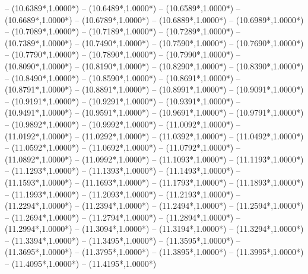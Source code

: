{	-- ({10.6389*\dx},{1.0000*\dy})
	-- ({10.6489*\dx},{1.0000*\dy})
	-- ({10.6589*\dx},{1.0000*\dy})
	-- ({10.6689*\dx},{1.0000*\dy})
	-- ({10.6789*\dx},{1.0000*\dy})
	-- ({10.6889*\dx},{1.0000*\dy})
	-- ({10.6989*\dx},{1.0000*\dy})
	-- ({10.7089*\dx},{1.0000*\dy})
	-- ({10.7189*\dx},{1.0000*\dy})
	-- ({10.7289*\dx},{1.0000*\dy})
	-- ({10.7389*\dx},{1.0000*\dy})
	-- ({10.7490*\dx},{1.0000*\dy})
	-- ({10.7590*\dx},{1.0000*\dy})
	-- ({10.7690*\dx},{1.0000*\dy})
	-- ({10.7790*\dx},{1.0000*\dy})
	-- ({10.7890*\dx},{1.0000*\dy})
	-- ({10.7990*\dx},{1.0000*\dy})
	-- ({10.8090*\dx},{1.0000*\dy})
	-- ({10.8190*\dx},{1.0000*\dy})
	-- ({10.8290*\dx},{1.0000*\dy})
	-- ({10.8390*\dx},{1.0000*\dy})
	-- ({10.8490*\dx},{1.0000*\dy})
	-- ({10.8590*\dx},{1.0000*\dy})
	-- ({10.8691*\dx},{1.0000*\dy})
	-- ({10.8791*\dx},{1.0000*\dy})
	-- ({10.8891*\dx},{1.0000*\dy})
	-- ({10.8991*\dx},{1.0000*\dy})
	-- ({10.9091*\dx},{1.0000*\dy})
	-- ({10.9191*\dx},{1.0000*\dy})
	-- ({10.9291*\dx},{1.0000*\dy})
	-- ({10.9391*\dx},{1.0000*\dy})
	-- ({10.9491*\dx},{1.0000*\dy})
	-- ({10.9591*\dx},{1.0000*\dy})
	-- ({10.9691*\dx},{1.0000*\dy})
	-- ({10.9791*\dx},{1.0000*\dy})
	-- ({10.9892*\dx},{1.0000*\dy})
	-- ({10.9992*\dx},{1.0000*\dy})
	-- ({11.0092*\dx},{1.0000*\dy})
	-- ({11.0192*\dx},{1.0000*\dy})
	-- ({11.0292*\dx},{1.0000*\dy})
	-- ({11.0392*\dx},{1.0000*\dy})
	-- ({11.0492*\dx},{1.0000*\dy})
	-- ({11.0592*\dx},{1.0000*\dy})
	-- ({11.0692*\dx},{1.0000*\dy})
	-- ({11.0792*\dx},{1.0000*\dy})
	-- ({11.0892*\dx},{1.0000*\dy})
	-- ({11.0992*\dx},{1.0000*\dy})
	-- ({11.1093*\dx},{1.0000*\dy})
	-- ({11.1193*\dx},{1.0000*\dy})
	-- ({11.1293*\dx},{1.0000*\dy})
	-- ({11.1393*\dx},{1.0000*\dy})
	-- ({11.1493*\dx},{1.0000*\dy})
	-- ({11.1593*\dx},{1.0000*\dy})
	-- ({11.1693*\dx},{1.0000*\dy})
	-- ({11.1793*\dx},{1.0000*\dy})
	-- ({11.1893*\dx},{1.0000*\dy})
	-- ({11.1993*\dx},{1.0000*\dy})
	-- ({11.2093*\dx},{1.0000*\dy})
	-- ({11.2193*\dx},{1.0000*\dy})
	-- ({11.2294*\dx},{1.0000*\dy})
	-- ({11.2394*\dx},{1.0000*\dy})
	-- ({11.2494*\dx},{1.0000*\dy})
	-- ({11.2594*\dx},{1.0000*\dy})
	-- ({11.2694*\dx},{1.0000*\dy})
	-- ({11.2794*\dx},{1.0000*\dy})
	-- ({11.2894*\dx},{1.0000*\dy})
	-- ({11.2994*\dx},{1.0000*\dy})
	-- ({11.3094*\dx},{1.0000*\dy})
	-- ({11.3194*\dx},{1.0000*\dy})
	-- ({11.3294*\dx},{1.0000*\dy})
	-- ({11.3394*\dx},{1.0000*\dy})
	-- ({11.3495*\dx},{1.0000*\dy})
	-- ({11.3595*\dx},{1.0000*\dy})
	-- ({11.3695*\dx},{1.0000*\dy})
	-- ({11.3795*\dx},{1.0000*\dy})
	-- ({11.3895*\dx},{1.0000*\dy})
	-- ({11.3995*\dx},{1.0000*\dy})
	-- ({11.4095*\dx},{1.0000*\dy})
	-- ({11.4195*\dx},{1.0000*\dy})
}
